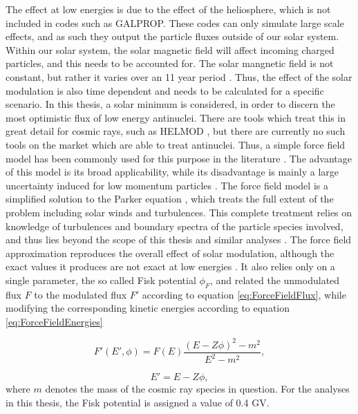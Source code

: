 The effect at low energies is due to the effect of the heliosphere, which is not included in codes such as GALPROP. These codes can only simulate large scale effects, and as such they output the particle fluxes outside of our solar system. Within our solar system, the solar magnetic field will affect incoming charged particles, and this needs to be accounted for. The solar mangnetic field is not constant, but rather it varies over an 11 year period \cite{Solar_cycle}. Thus, the effect of the solar modulation is also time dependent and needs to be calculated for a specific scenario. In this thesis, a solar minimum is considered, in order to discern the most optimistic flux of low energy antinuclei. There are tools which treat this in great detail for cosmic rays, such as HELMOD \cite{helmod}, but there are currently no such tools on the market which are able to treat antinuclei. Thus, a simple force field model has been commonly used for this purpose in the literature \cite{Ibarra:2012cc, Coogan_2017, Korsmeier:2017xzj}. The advantage of this model is its broad applicability, while its disadvantage is mainly a large uncertainty induced for low momentum particles \cite{Force_field}. The force field model is a simplified solution to the Parker equation \cite{29 from CR AN}, which treats the full extent of the problem including solar winds and turbulences. This complete treatment relies on knowledge of turbulences and boundary spectra of the particle species involved, and thus lies beyond the scope of this thesis and similar analyses \cite{Korsmeier:2017xzj, Ibarra:2012cc, Boschini:2018baj}. The force field approximation reproduces the overall effect of solar modulation, although the exact values it produces are not exact at low energies \cite{Force_field}. It also relies only on a single parameter, the so called Fisk potential $\phi_F$, and related the unmodulated flux $F$ to the modulated flux $F'$ according to equation \ref{eq:ForceFieldFlux}, while modifying the corresponding kinetic energies according to equation \ref{eq:ForceFieldEnergies}

\begin{equation}
    \label{eq:ForceFieldFlux}
    F' (E', \phi) = F(E) \frac{(E-Z\phi)^2 - m^2}{E^2-m^2},
\end{equation}

\begin{equation}
    \label{eq:ForceFieldEnergies}
    E' = E-Z\phi,
\end{equation}
where $m$ denotes the mass of the cosmic ray species in question. For the analyses in this thesis, the Fisk potential is assigned a value of 0.4 GV. \\

